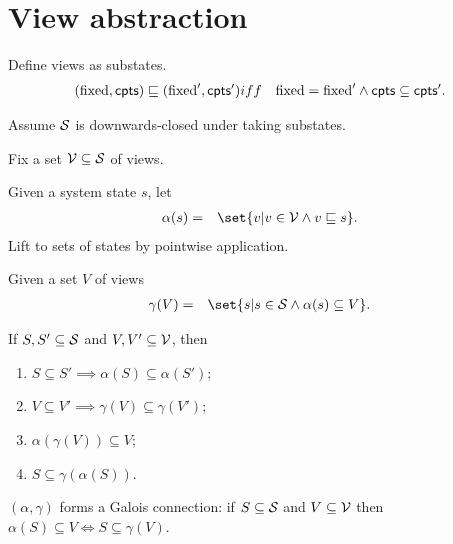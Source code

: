 
\section{View abstraction}

Define views as substates.
\begin{eqnarray*}
(\fixed, \cpt ) \sqle (\fixed', \cpt') & iff & 
  \fixed = \fixed' \land \cpt \subseteq \cpt' .
\end{eqnarray*}

Assume $\S$ is downwards-closed under taking substates. 

Fix a set $\V \subseteq \S$ of views.

Given a system state $s$, let
%
\begin{eqnarray*}
\alpha(s) & = &
  \set{ v | v \in \V \land v \sqle s}.
\end{eqnarray*}
%
Lift to sets of states by pointwise application. 

Given a set $V$ of views
\begin{eqnarray*}
\gamma(V) & = &   \set{ s | s \in \S \land \alpha(s) \subseteq V }.
\end{eqnarray*}



\begin{lemma}
If $S, S' \subseteq \S$ and $V, V' \subseteq \V$, then
\begin{enumerate}
\item $S \subseteq S' \implies \alpha(S) \subseteq \alpha(S')$;

\item $V \subseteq V' \implies \gamma(V) \subseteq \gamma(V')$;

\item $\alpha(\gamma(V)) \subseteq V$;

\item $S \subseteq \gamma(\alpha(S))$.
\end{enumerate}
\end{lemma}
%



\begin{lemma}
$(\alpha, \gamma)$ forms a Galois connection: if $S \subseteq \S$ and $V
  \subseteq \V$ then $\alpha(S) \subseteq V \iff S \subseteq \gamma(V)$.
\end{lemma}
%

